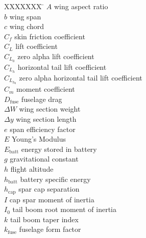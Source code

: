 \documentclass[]{aiaa-tc}%
\begin{document}
\begin{multicols}{2}
\small

\begin{tabbing}
  XXXXXXX \= \kill%
$A$ \> wing aspect ratio \\
$b$ \> wing span \\ %
$c$ \> wing chord \\ %
$C_f$ \> skin friction coefficient \\
$C_L$ \> lift coefficient \\
$C_{L_0}$ \> zero alpha lift coefficient \\
$C_{L_h}$ \> horizontal tail lift coefficient \\
$C_{L_{h_0}}$ \> zero alpha horizontal tail lift coefficient \\
$C_m$ \> moment coefficient \\ 
$D_{\text{fuse}}$ \> fuselage drag \\%
$\Delta W$ \> wing section weight \\ %
$\Delta y$ \> wing section length \\ %
$e$ \> span efficiency factor \\
$E$ \> Young's Modulus \\ %
$E_{\text{batt}}$ \> energy stored in battery \\ %
$g$ \> gravitational constant \\ %
$h$ \> flight altitude \\ %
$h_{\text{batt}}$ \> battery specific energy \\ %
$h_{\text{cap}}$ \> spar cap separation \\ %
$I$ \> cap spar moment of inertia \\ %
$I_0$ \> tail boom root moment of inertia \\ %
$k$ \> tail boom taper index \\
$k_{\mathrm{fuse}}$ \> fuselage form factor \\

\end{tabbing}
\end{multicols}
\end{document}
